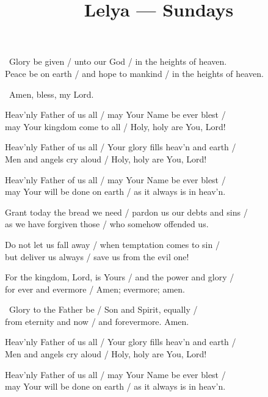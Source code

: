 \documentclass[12pt,twoside,a5paper]{article}
\begin{document}
\title{Lelya --- Sundays}
\author{}
\date{}
\maketitle


\begin{halfparskip}

  \cc~Glory be given / unto our God / in the heights of heaven.\\
  Peace be on earth / and hope to mankind / in the heights of heaven.

  \rr~Amen, bless, my Lord. 

  Heav'nly Father of us all / may Your Name be ever blest / \\
  may Your kingdom come to all / Holy, holy are You, Lord!

  Heav'nly Father of us all / Your glory fills heav'n and earth / \\
  Men and angels cry aloud / Holy, holy are You, Lord!

  Heav'nly Father of us all / may Your Name be ever blest /\\
  may Your will be done on earth / as it always is in heav'n.

  Grant today the bread we need / pardon us our debts and sins /\\
  as we have forgiven those / who somehow offended us.

  Do not let us fall away / when temptation comes to sin / \\
  but deliver us always / save us from the evil one!

  For the kingdom, Lord, is Yours / and the power and glory / \\
  for ever and evermore / Amen; evermore; amen.

  \cc~Glory to the Father be / Son and Spirit, equally / \\
  from eternity and now / and forevermore. Amen.

  Heav'nly Father of us all / Your glory fills heav'n and earth / \\
  Men and angels cry aloud / Holy, holy are You, Lord!

  Heav'nly Father of us all / may Your Name be ever blest / \\
  may Your will be done on earth / as it always is in heav'n.
\end{halfparskip}
\end{document}
